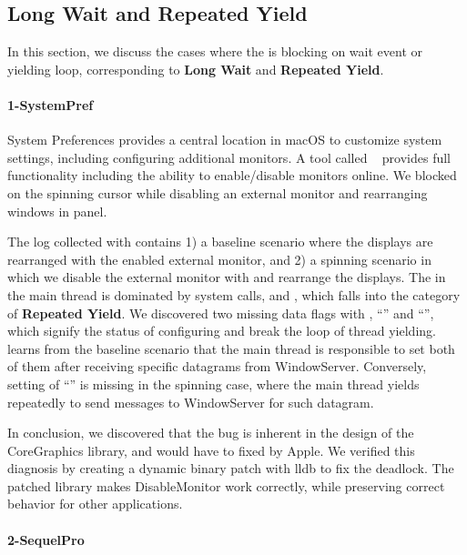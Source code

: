 \subsection{Long Wait and Repeated Yield}
In this section, we discuss the cases where the \spinningnode is blocking
on wait event or yielding loop, corresponding to \textbf{Long Wait} and
\textbf{Repeated Yield}.

\paragraph{1-SystemPref}

System Preferences provides a central location in macOS to customize
system settings, including configuring additional monitors. A tool called
~\cite{disablemonitor} provides full functionality including
the ability to enable/disable monitors online. We blocked on the spinning cursor
while disabling an external monitor and rearranging windows in 
panel.

The log collected with \xxx contains 1) a baseline scenario where the displays
are rearranged with the enabled external monitor, and 2) a spinning scenario in
which we disable the external monitor with  and rearrange
the displays. The \spinningnode in the main thread is dominated by system
calls,  and , which falls into the category of
\textbf{Repeated Yield}. We discovered two missing data flags with ,
``'' and ``'', which
signify the status of configuring and break the loop of thread yielding. \xxx
learns from the baseline scenario that the main thread is responsible to set
both of them after receiving specific datagrams from WindowServer. Conversely,
setting of ``'' is missing in the spinning case,
where the main thread yields repeatedly to send messages to WindowServer for
such datagram.

In conclusion, we discovered that the bug is inherent in the design of the
CoreGraphics library, and would have to fixed by Apple. We verified this
diagnosis by creating a dynamic binary patch with lldb to fix the deadlock. The
patched library makes DisableMonitor work correctly, while preserving correct
behavior for other applications.

\paragraph{2-SequelPro}

